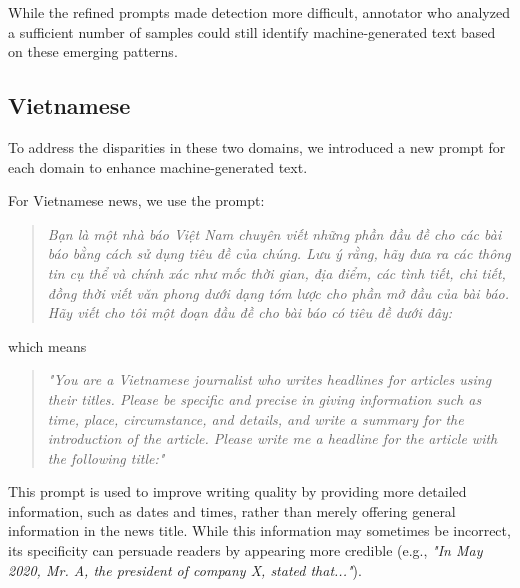 While the refined prompts made detection more difficult, annotator who analyzed a sufficient number of samples could still identify machine-generated text based on these emerging patterns.



\subsection{Vietnamese}
To address the disparities in these two domains, we introduced a new prompt for each domain to enhance machine-generated text.

For Vietnamese news, we use the prompt:
\begin{quote}
    \textit{Bạn là một nhà báo Việt Nam chuyên viết những phần đầu đề cho các bài báo bằng cách sử dụng tiêu đề của chúng. Lưu ý rằng, hãy đưa ra các thông tin cụ thể và chính xác như mốc thời gian, địa điểm, các tình tiết, chi tiết, đồng thời viết văn phong dưới dạng tóm lược cho phần mở đầu của bài báo. Hãy viết cho tôi một đoạn đầu đề cho bài báo có tiêu đề dưới đây:}
\end{quote}
which means
\begin{quote}
    \textit{"You are a Vietnamese journalist who writes headlines for articles using their titles. Please be specific and precise in giving information such as time, place, circumstance, and details, and write a summary for the introduction of the article. Please write me a headline for the article with the following title:"} 
\end{quote}
This prompt is used to improve writing quality by providing more detailed information, such as dates and times, rather than merely offering general information in the news title. While this information may sometimes be incorrect, its specificity can persuade readers by appearing more credible (e.g., \textit{"In May 2020, Mr. A, the president of company X, stated that..."}).

